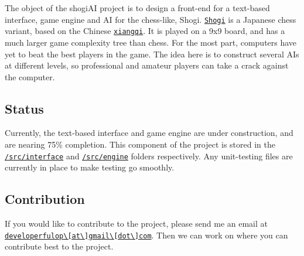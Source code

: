 The object of the shogi\-A\-I project is to design a front-\/end for a text-\/based interface, game engine and A\-I for the chess-\/like, Shogi. \href{http://en.wikipedia.org/wiki/Shogi}{\tt Shogi} is a Japanese chess variant, based on the Chinese \href{http://en.wikipedia.org/wiki/Shogi}{\tt xiangqi}. It is played on a 9x9 board, and has a much larger game complexity tree than chess. For the most part, computers have yet to beat the best players in the game. The idea here is to construct several A\-Is at different levels, so professional and amateur players can take a crack against the computer.

\subsection*{Status}

Currently, the text-\/based interface and game engine are under construction, and are nearing 75\% completion. This component of the project is stored in the \href{https://github.com/richiebful/shogi/tree/master/src/interface}{\tt /src/interface} and \href{https://github.com/richiebful/shogi/tree/master/src/engine}{\tt /src/engine} folders respectively. Any unit-\/testing files are currently in place to make testing go smoothly.

\subsection*{Contribution}

If you would like to contribute to the project, please send me an email at \href{mailto:developerfulop@gmail.com}{\tt developerfulop\textbackslash{}\mbox{[}at\textbackslash{}\mbox{]}gmail\textbackslash{}\mbox{[}dot\textbackslash{}\mbox{]}com}. Then we can work on where you can contribute best to the project. 